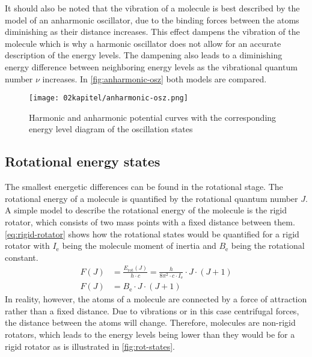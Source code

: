 It should also be noted that the vibration of a molecule is best described by the model of an anharmonic oscillator, due to the binding forces between the atoms diminishing as their distance increases. This effect dampens the vibration of the molecule which is why a harmonic oscillator does not allow for an accurate description of the energy levels. The dampening also leads to a diminishing energy difference between neighboring energy levels as the vibrational quantum number $\nu$ increases. In \autoref{fig:anharmonic-osz} both models are compared.

\begin{figure}[!htb]
    \centering
    \texttt{[image: 02kapitel/anharmonic-osz.png]}
    \caption[Model of an anharmonic oszillator]{Harmonic and anharmonic potential curves with the corresponding energy level diagram
    of the oscillation states \autocite{brauerApplicationRamanSpectroscopy2022}}
    \label{fig:anharmonic-osz}
\end{figure}

\subsection{Rotational energy states}

The smallest energetic differences can be found in the rotational stage. The rotational energy of a molecule is quantified by the rotational quantum number $J$. A simple model to describe the rotational energy of the molecule is the rigid rotator, which consists of two mass points with a fixed distance between them. \autoref{eq:rigid-rotator} shows how the rotational states would be quantified for a rigid rotator with $I_\mathrm{e}$ being the molecule moment of inertia and $B_\mathrm{e}$ being the rotational constant.
\begin{align}
    F(J)&=\frac{E_\mathrm{rot}(J)}{h \cdot c}=\frac{h}{8\pi^2 \cdot c \cdot I_\mathrm{e}} \cdot J \cdot (J+1) \nonumber \\[6pt]
    F(J)&=B_\mathrm{e} \cdot J \cdot (J+1) \label{eq:rigid-rotator}
\end{align}
In reality, however, the atoms of a molecule are connected by a force of attraction rather than a fixed distance.  Due to vibrations or in this case centrifugal forces, the distance between the atoms will change. Therefore, molecules are non-rigid rotators, which leads to the energy levels being lower than they would be for a rigid rotator as is illustrated in \autoref{fig:rot-states}.

